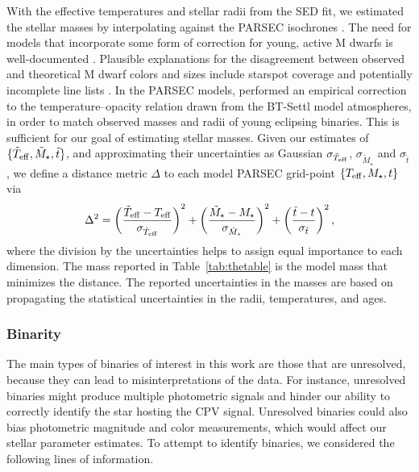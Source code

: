\documentclass[11pt,twocolumn,tighten,linenumbers]{aastex63}
\begin{document}
With the effective temperatures and stellar radii from the SED fit, we
estimated the stellar masses by interpolating against the PARSEC
isochrones \citep[v1.2S][]{2014MNRAS.444.2525C}.  The need for models
that incorporate some form of correction for young, active M dwarfs is
well-documented
\citep[e.g.][]{2012ApJ...756...47S,2015ApJ...804..146D,2016A&A...593A..99F,2020ApJ...891...29S}.
Plausible explanations for the disagreement between observed and
theoretical M dwarf colors and sizes include starspot coverage
\citep[e.g.][]{2017ApJ...836..200G} and potentially incomplete line
lists \citep[e.g.][]{2013A&A...556A..15R}.  In the PARSEC models,
\citet{2014MNRAS.444.2525C} performed an empirical correction to the
temperature--opacity relation drawn from the BT-Settl model
atmospheres, in order to match observed masses and radii of young
eclipsing binaries.  This is sufficient for our goal of estimating
stellar masses.  Given our estimates of $\{ \tilde{T}_{\rm eff},
\tilde{M}_\star, \tilde{t} \}$, and approximating their uncertainties
as Gaussian $\sigma_{\tilde{T}_{\rm eff}}$, $\sigma_{\tilde{M}_\star}$
and $\sigma_{\tilde{t}}$, we define a distance metric $\Delta$ to each
model PARSEC grid-point $\{ T_{\rm eff}, M_\star, t \}$ via
\begin{equation}
  \Delta^2 = 
  \left( \frac{\tilde{T}_{\rm eff} - T_{\rm eff}}{\sigma_{\tilde{T}_{\rm eff}}} \right)^2
  +
  \left( \frac{\tilde{M}_{\star} - M_{\star}}{\sigma_{\tilde{M}_{\star}}} \right)^2
  +
  \left( \frac{\tilde{t} - t}{\sigma_{\tilde{t}}} \right)^2,
\end{equation}
where the division by the uncertainties helps to assign equal
importance to each dimension.  The mass reported in
Table~\ref{tab:thetable} is the model mass that minimizes the
distance.  The reported uncertainties in the masses are based on
propagating the statistical uncertainties in the radii, temperatures,
and ages.


\subsubsection{Binarity}

The main types of binaries of interest in this work are those that are
unresolved, because they can lead to misinterpretations of the data.
For instance, unresolved binaries might produce multiple photometric
signals and hinder our ability to correctly identify the star hosting
the CPV signal.  Unresolved binaries could also bias photometric
magnitude and color measurements, which would affect our stellar
parameter estimates.  To attempt to identify binaries, we considered
the following lines of information.
\end{document}
